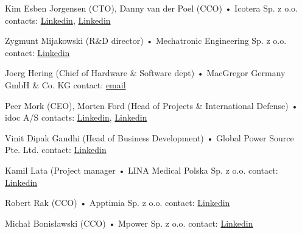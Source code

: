 \documentclass{tccv}
\begin{document}
\begin{yearlist}

\item[Kim Esben Jorgensen (CTO), Danny van der Poel (CCO)]{•}
     {Icotera Sp. z o.o.}
     {contacts: \href{https://www.linkedin.com/in/kim-esben-j\%C3\%B8rgensen-8685229/}{Linkedin}, \href{https://www.linkedin.com/in/dannyvanderpoel/}{Linkedin}}

\item[Zygmunt Mijakowski (R\&D director)]{•}
     {Mechatronic Engineering Sp. z o.o.}
     {contact: \href{https://www.linkedin.com/in/zmijakowski/}{Linkedin}}
     
\item[Joerg Hering (Chief of Hardware \& Software dept)]{•}
     {MacGregor Germany GmbH \& Co. KG}
     {contact: \href{mailto:jhe@danelec.com}{email}}
     
\item[Peer Mork (CEO), Morten Ford (Head of Projects \& International Defense)]{•}
     {idoc A/S}
     {contacts: \href{https://www.linkedin.com/in/peermork}{Linkedin}, \href{https://www.linkedin.com/in/morten-ford-08368264}{Linkedin}}
     
\item[Vinit Dipak Gandhi (Head of Business Development)]{•}
     {Global Power Source Pte. Ltd. }
     {contact: \href{https://www.linkedin.com/in/vinit-dipak-gandhi-71782612}{Linkedin}}
     
\item[Kamil Lata (Project manager]{•}
     {LINA Medical Polska Sp. z o.o.}
     {contact: \href{https://www.linkedin.com/in/kamil-lata-a71a41138}{Linkedin}}
     
\item[Robert Rak (CCO)]{•}
     {Apptimia Sp. z o.o.}
     {contact: \href{https://www.linkedin.com/in/robert-rak-4018a64a}{Linkedin}}

\item[Michał Bonisławski (CCO)]{•}
     {Mpower Sp. z o.o.}
     {contact: \href{https://www.linkedin.com/in/micha\%C5\%82-bonis\%C5\%82awski-322bb91aa}{Linkedin}}

\end{yearlist}
\end{document}
